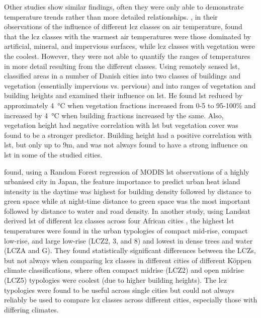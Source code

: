 \documentclass[final,3p,times,authoryear]{elsarticle}
\begin{document}
Other studies show similar findings, often they were only able to demonstrate temperature trends rather than more detailed relationships. \cite{Emery2021}, in their observations of the influence of different \gls{lcz} classes on air temperature, found that the \gls{lcz} classes with the warmest air temperatures were those dominated by artificial, mineral, and impervious surfaces, while \gls{lcz} classes with vegetation were the coolest. However, they were not able to quantify the ranges of temperatures in more detail resulting from the different classes. Using remotely sensed \gls{lst}, \cite{Alexander2021} classified areas in a number of Danish cities into two classes of buildings and vegetation (essentially impervious vs. pervious) and into ranges of vegetation and building heights and examined their influence on \gls{lst}. He found \gls{lst} reduced by approximately 4\SI{}{\degreeCelsius} when vegetation fractions increased from 0-5 to 95-100\% and increased by 4\SI{}{\degreeCelsius} when building fractions increased by the same. Also, vegetation height had negative correlation with \gls{lst} but vegetation cover was found to be a stronger predictor. Building height had a positive correlation with \gls{lst}, but only up to 9m, and was not always found to have a strong influence on \gls{lst} in some of the studied cities. 

\cite{Peng2022} found, using a Random Forest regression of MODIS \gls{lst} observations of a highly urbanised city in Japan, the feature importance to predict urban heat island intensity in the daytime was highest for building density followed by distance to green space while at night-time distance to green space was the most important followed by distance to water and road density. In another study, using Landsat derived \gls{lst} of different \gls{lcz} classes across four African cities \citep{Li2022}, the highest \gls{lst} temperatures were found in the urban typologies of compact mid-rise, compact low-rise, and large low-rise (LCZ2, 3, and 8) and lowest in dense trees and water (LCZA and G). They found statistically significant differences between the LCZs, but not always when comparing \gls{lcz} classes in different cities of different K\"{o}ppen climate classifications, where often compact midrise (LCZ2) and open midrise (LCZ5) typologies were coolest (due to higher building heights). The \gls{lcz} typologies were found to be useful across single cities but could not always reliably be used to compare \gls{lcz} classes across different cities, especially those with differing climates.
\end{document}
